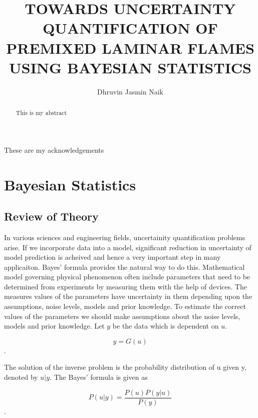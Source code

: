 \documentclass[10pt]{ubthesis}
\title{TOWARDS UNCERTAINTY QUANTIFICATION OF PREMIXED LAMINAR FLAMES USING BAYESIAN STATISTICS}
\author{Dhruvin Jasmin Naik}
\begin{document}
\begin{titlepage}
\maketitle
\end{titlepage}

\begin{ubfrontmatter}
\makecopyright
\cleardoublepage
\begin{acknowledgements}
These are my acknowledgements
\end{acknowledgements}
\tableofcontents

\cleardoublepage
\listoffigures
\cleardoublepage
\listoftables
\cleardoublepage
\begin{abstract}
This is my abstract
\end{abstract}
\end{ubfrontmatter}






\chapter{Bayesian Statistics}
\section{Review of Theory}

In various sciences and engineering fields, uncertainity quantification problems arise. If we  incorporate data into a model, significant reduction in uncertainty of model prediction is acheived and hence a very important step in many applicaiton. Bayes' formula provides the natural way to do this. Mathematical model governing physical phenomenon often include parameters that need to be determined from experiments by measuring them with the help of devices. The measures values of the parameters have uncertainty in them depending upon the assumptions, noise levels, models and prior knowledge. To estimate the correct values of the parameters we should make assumptions about the noise levels, models and prior knowledge. Let $y$ be the data which is dependent on $u$. 

$$y = G(u)$$. 

\noindent The solution of the inverse problem is the probability distribution of u given y, denoted by $u|y$. The Bayes' formula is given as 

$$P(u|y) = \frac{P(u) P(y|u)}{P(y)}$$ .
 
\end{document}
